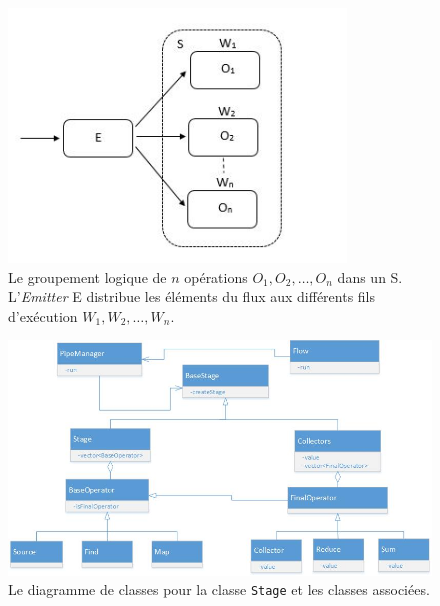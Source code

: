 
\begin{figure}
\centering
     \includegraphics[width=0.8\textwidth]{Figures/Stages.jpg}
      \caption[Le groupement logique de $n$ op\'erations $O_1, O_2, \ldots, O_n$ dans un  S.]{Le groupement logique de $n$ op\'erations $O_1, O_2, \ldots, O_n$ dans un  S.  L'\emph{Emitter} E distribue les \'el\'ements du flux aux diff\'erents fils d'ex\'ecution $W_1, W_2, \ldots, W_n$.}
       \label{Stages.fig}
\end{figure}

\begin{figure}
\centering
     \includegraphics[width=1.0\textwidth]{Figures/StagesClassDiagramme.jpg}
      \caption{Le diagramme de classes pour la classe \texttt{Stage} et les classes associ\'ees.}
       \label{StagesClassDiagramme.fig}
\end{figure}



